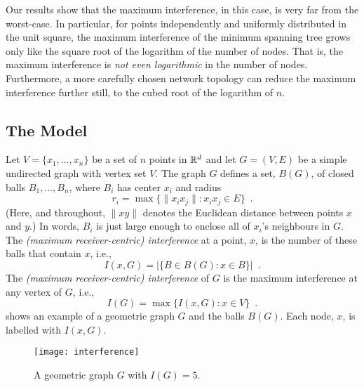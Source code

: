 \documentclass{cccg12}
\begin{document}
Our results show that the maximum interference, in this case, is very
far from the worst-case.  In particular, for points independently and
uniformly distributed in the unit square, the maximum interference of the
minimum spanning tree grows only like the square root of the logarithm
of the number of nodes.  That is, the maximum interference is \emph{not
even logarithmic} in the number of nodes.  Furthermore, a more carefully
chosen network topology can reduce the maximum interference further still,
to the cubed root of the logarithm of $n$.

\subsection{The Model}

Let $V=\{x_1,\ldots,x_n\}$ be a set of $n$ points in $\mathbb{R}^d$ and let
$G=(V,E)$ be a simple undirected graph with vertex set $V$.  The graph
$G$ defines a set, $B(G)$, of closed balls $B_1,\ldots,B_n$, where $B_i$
has center $x_i$ and radius
\[
   r_i = \max\{\|x_ix_j\| : x_ix_j\in E\} \enspace .
\]
(Here, and throughout, $\|xy\|$ denotes the Euclidean distance between
points $x$ and $y$.)  In words, $B_i$ is just large enough to enclose
all of $x_i$'s neighbours in $G$.  The \emph{(maximum receiver-centric)
interference} at a point, $x$, is the number of these balls that contain
$x$, i.e.,
\[
    I(x,G) = |\{B\in B(G) : x\in B\}| \enspace .
\]
The \emph{(maximum receiver-centric) interference} of $G$ is the maximum
interference at any vertex of $G$, i.e.,
\[
   I(G) = \max\{I(x,G) : x\in V\} \enspace .
\]
 shows an example of a geometric graph $G$ and the
balls $B(G)$.  Each node, $x$, is labelled with $I(x,G)$.

\begin{figure}
  \begin{center}
    \texttt{[image: interference]}
  \end{center}
  \caption{A geometric graph $G$ with $I(G)=5$.}
\end{figure}
\end{document}
